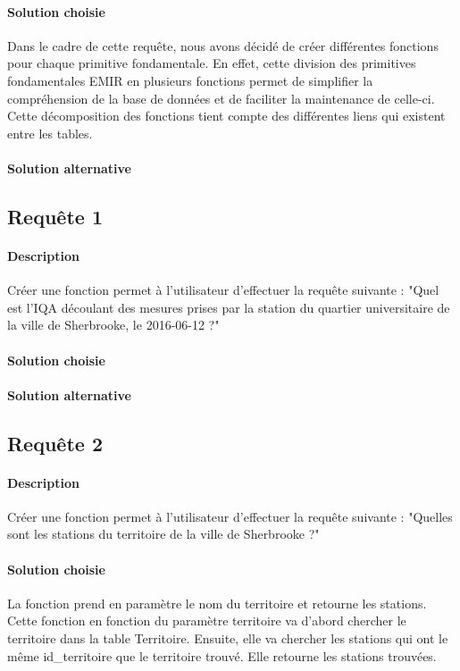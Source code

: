 \documentclass{article}
\begin{document}
\paragraph{Solution choisie}
Dans le cadre de cette requête, nous avons décidé de créer différentes fonctions pour chaque primitive fondamentale.
En effet, cette division des primitives fondamentales EMIR en plusieurs fonctions permet de simplifier la compréhension de la base de données et de faciliter la maintenance de celle-ci.
Cette décomposition des fonctions tient compte des différentes liens qui existent entre les tables.

\paragraph{Solution alternative}

\subsection{Requête 1}
\paragraph{Description} Créer une fonction permet à l'utilisateur
d'effectuer la requête suivante : "Quel est l'IQA découlant des mesures
prises par la station du quartier universitaire de la ville de Sherbrooke,
le 2016-06-12 ?"

\paragraph{Solution choisie}

\paragraph{Solution alternative}

\subsection{Requête 2}
\paragraph{Description} Créer une fonction permet à l'utilisateur
d'effectuer la requête suivante : "Quelles sont les stations du territoire
de la ville de Sherbrooke ?"

\paragraph{Solution choisie}
La fonction prend en paramètre le nom du territoire et retourne les stations. Cette fonction en fonction du paramètre territoire va d'abord chercher le territoire dans la table Territoire. Ensuite, elle va chercher les stations qui ont le même id\_territoire que le territoire trouvé. Elle retourne les stations trouvées.
\end{document}

